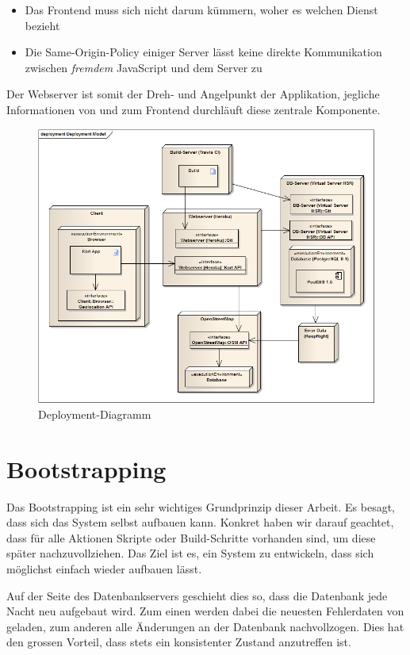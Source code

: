 \begin{itemize}
\item Das Frontend muss sich nicht darum kümmern, woher es welchen Dienst bezieht
\item Die Same-Origin-Policy\cite{sop} einiger Server lässt keine direkte Kommunikation zwischen \emph{fremdem} JavaScript und dem Server zu
\end{itemize}

Der Webserver ist somit der Dreh- und Angelpunkt der Applikation, jegliche Informationen von und zum Frontend durchläuft diese zentrale Komponente.

\begin{figure}[H]
	\centering
	\includegraphics[width=\textwidth]{images/uml/deployment_diagram}
	\caption{Deployment-Diagramm}
	\label{deplyoyment-diagram}
\end{figure}

\section{Bootstrapping}
Das \gls{Bootstrapping} ist ein sehr wichtiges Grundprinzip dieser Arbeit.
Es besagt, dass sich das System selbst aufbauen kann.
Konkret haben wir darauf geachtet, dass für alle Aktionen Skripte oder Build-Schritte vorhanden sind, um diese später nachzuvollziehen.
Das Ziel ist es, ein System zu entwickeln, dass sich möglichst einfach wieder aufbauen lässt.

Auf der Seite des Datenbankservers geschieht dies so, dass die Datenbank jede Nacht neu aufgebaut wird.
Zum einen werden dabei die neuesten Fehlerdaten von  geladen, zum anderen alle Änderungen an der Datenbank nachvollzogen.
Dies hat den grossen Vorteil, dass stets ein konsistenter Zustand anzutreffen ist.

